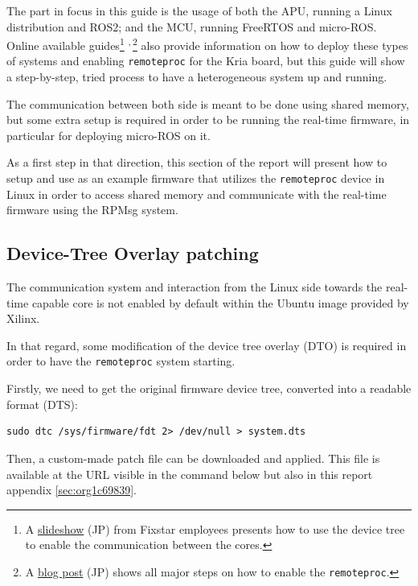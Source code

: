 \documentclass[10pt]{article}
\begin{document}
The part in focus in this guide is the usage of both the APU, running
a Linux distribution and ROS2; and the MCU, running FreeRTOS and micro-ROS.
Online available guides\footnote{A \href{https://speakerdeck.com/fixstars/fpga-seminar-12-fixstars-corporation-20220727}{slideshow} (JP) from Fixstar employees presents how to use the device
tree to enable the communication between the cores.} \textsuperscript{,}\,\footnote{A \href{https://zenn.dev/ryuz88/articles/kv260\_setup\_memo\_ubuntu22 }{blog post} (JP) shows all major steps on how to enable the \texttt{remoteproc}.} also provide information on how to deploy these types
of systems and enabling \texttt{remoteproc} for the Kria board, but this guide
will show a step-by-step, tried process to have a heterogeneous system
up and running.

The communication between both side is meant to be done using shared memory, but
some extra setup is required in order to be running the real-time firmware, in particular
for deploying micro-ROS on it.

As a first step in that direction, this section of the report
will present how to setup and use as an example firmware that utilizes the
\texttt{remoteproc} device in Linux in order to access shared memory
and communicate with the real-time firmware using the RPMsg system.

\subsection{Device-Tree Overlay patching}
\label{sec:orgf8849cf}
The communication system and interaction from the Linux side towards the real-time capable core
is not enabled by default within the Ubuntu image provided by Xilinx.

In that regard, some modification of the device tree overlay (DTO) is required in order to have
the \texttt{remoteproc} system starting.

Firstly, we need to get the original firmware device tree, converted
into a readable format (DTS):

\begin{verbatim}
sudo dtc /sys/firmware/fdt 2> /dev/null > system.dts
\end{verbatim}

Then, a custom-made patch file can be downloaded and applied.
This file is available at the URL visible in the command below
but also in this report appendix \ref{sec:org1c69839}.
\end{document}
